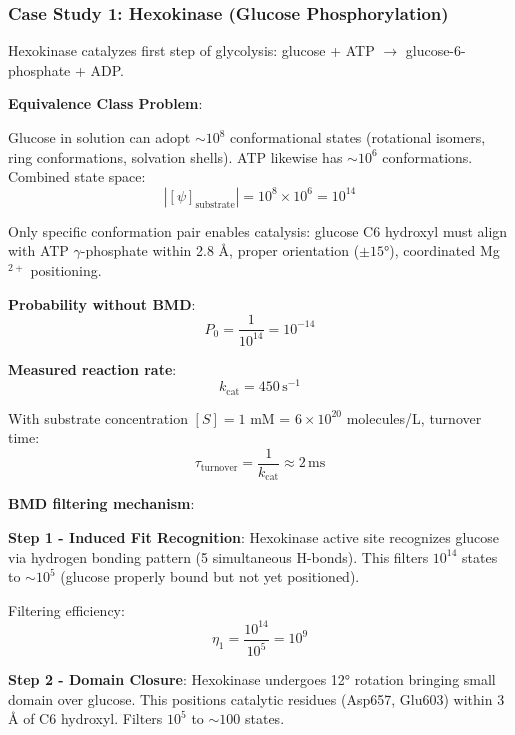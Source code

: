 \documentclass[11pt,onecolumn]{article}
\begin{document}
\subsubsection{Case Study 1: Hexokinase (Glucose Phosphorylation)}

Hexokinase catalyzes first step of glycolysis: glucose + ATP $\to$ glucose-6-phosphate + ADP.

\textbf{Equivalence Class Problem}:

Glucose in solution can adopt $\sim 10^8$ conformational states (rotational isomers, ring conformations, solvation shells). ATP likewise has $\sim 10^6$ conformations. Combined state space:
\begin{equation}
|[\psi]_{\text{substrate}}| = 10^8 \times 10^6 = 10^{14}
\end{equation}

Only specific conformation pair enables catalysis: glucose C6 hydroxyl must align with ATP $\gamma$-phosphate within 2.8 Å, proper orientation ($\pm 15°$), coordinated Mg$^{2+}$ positioning.

\textbf{Probability without BMD}:
\begin{equation}
P_0 = \frac{1}{10^{14}} = 10^{-14}
\end{equation}

\textbf{Measured reaction rate}:
\begin{equation}
k_{\text{cat}} = 450\,\text{s}^{-1}
\end{equation}

With substrate concentration $[S] = 1$ mM = $6 \times 10^{20}$ molecules/L, turnover time:
\begin{equation}
\tau_{\text{turnover}} = \frac{1}{k_{\text{cat}}} \approx 2\,\text{ms}
\end{equation}

\textbf{BMD filtering mechanism}:

\textbf{Step 1 - Induced Fit Recognition}: Hexokinase active site recognizes glucose via hydrogen bonding pattern (5 simultaneous H-bonds). This filters $10^{14}$ states to $\sim 10^5$ (glucose properly bound but not yet positioned).

Filtering efficiency:
\begin{equation}
\eta_1 = \frac{10^{14}}{10^5} = 10^9
\end{equation}

\textbf{Step 2 - Domain Closure}: Hexokinase undergoes 12° rotation bringing small domain over glucose. This positions catalytic residues (Asp657, Glu603) within 3 Å of C6 hydroxyl. Filters $10^5$ to $\sim 100$ states.
\end{document}
